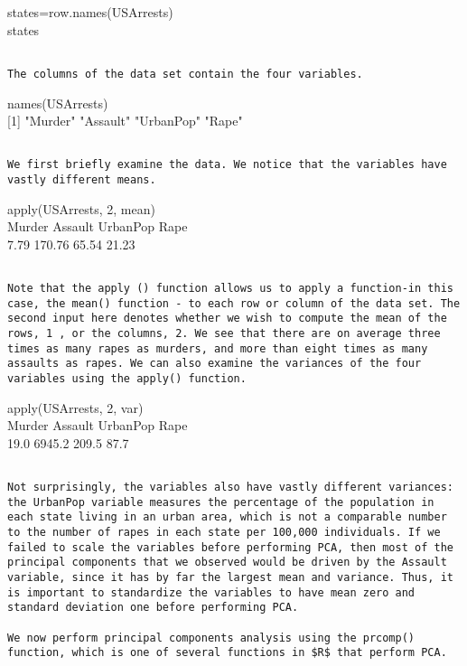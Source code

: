 \documentclass[10pt]{article}
\begin{document}
\begin{displayquote}
states=row.names(USArrests)\\
states
\end{displayquote}

\begin{verbatim}

The columns of the data set contain the four variables.
\end{verbatim}

\begin{displayquote}
names(USArrests)\\[0pt]
[1] "Murder" "Assault" "UrbanPop" "Rape"
\end{displayquote}

\begin{verbatim}

We first briefly examine the data. We notice that the variables have vastly different means.
\end{verbatim}

\begin{displayquote}
apply(USArrests, 2, mean)\\
Murder Assault UrbanPop Rape\\
7.79 170.76 65.54 21.23
\end{displayquote}

\begin{verbatim}

Note that the apply () function allows us to apply a function-in this case, the mean() function - to each row or column of the data set. The second input here denotes whether we wish to compute the mean of the rows, 1 , or the columns, 2. We see that there are on average three times as many rapes as murders, and more than eight times as many assaults as rapes. We can also examine the variances of the four variables using the apply() function.
\end{verbatim}

\begin{displayquote}
apply(USArrests, 2, var)\\
Murder Assault UrbanPop Rape\\
19.0 6945.2 209.5 87.7
\end{displayquote}

\begin{verbatim}

Not surprisingly, the variables also have vastly different variances: the UrbanPop variable measures the percentage of the population in each state living in an urban area, which is not a comparable number to the number of rapes in each state per 100,000 individuals. If we failed to scale the variables before performing PCA, then most of the principal components that we observed would be driven by the Assault variable, since it has by far the largest mean and variance. Thus, it is important to standardize the variables to have mean zero and standard deviation one before performing PCA.

We now perform principal components analysis using the prcomp() function, which is one of several functions in $R$ that perform PCA.
\end{verbatim}
\end{document}
